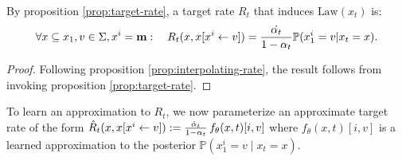 \begin{proposition} \label{masked-diffusion-target-rate}
By proposition \ref{prop:target-rate}, a target rate $R_t$ that induces $\text{Law}(x_t)$ is:
\begin{align}
   \forall x \subseteq x_1, v \in \Sigma, x^i=\mathbf{m}: \quad  R_t(x, x[x^{i} \leftarrow v]) = \frac{\dot{\alpha_t}}{1-\alpha_t}\mathbb{P}(x_1^i = v | x_t = x).
\end{align}
\end{proposition}
\begin{proof}
Following proposition \ref{prop:interpolating-rate}, the result follows from invoking proposition \ref{prop:target-rate}.
\end{proof}
To learn an approximation to $R_t$, we now parameterize an approximate target rate of the form  $
\hat{R}_t(x, x[x^{i} \leftarrow v]):=\frac{\dot{\alpha}_t}{1 - \alpha_t} \, f_\theta(x, t)[i,v]$
where $f_\theta(x, t)[i,v]$ is a learned approximation to the posterior \(\mathbb{P}(x_1^i = v \mid x_t = x)\).

